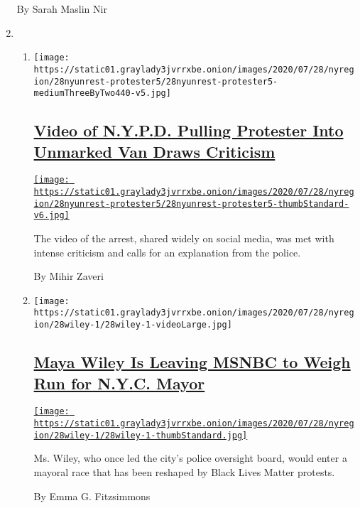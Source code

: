 \begin{enumerate}
  By Sarah Maslin Nir
\item
  \begin{enumerate}
  \def\labelenumii{\arabic{enumii}.}
  \item
    \texttt{[image: https://static01.graylady3jvrrxbe.onion/images/2020/07/28/nyregion/28nyunrest-protester5/28nyunrest-protester5-mediumThreeByTwo440-v5.jpg]}

    \hypertarget{video-of-nypd-pulling-protester-into-unmarked-van-draws-criticism}{%
    \subsection{\texorpdfstring{\href{/2020/07/28/nyregion/nypd-protester-van.html}{Video
    of N.Y.P.D. Pulling Protester Into Unmarked Van Draws
    Criticism}}{Video of N.Y.P.D. Pulling Protester Into Unmarked Van Draws Criticism}}\label{video-of-nypd-pulling-protester-into-unmarked-van-draws-criticism}}

    \href{/2020/07/28/nyregion/nypd-protester-van.html}{\texttt{[image: https://static01.graylady3jvrrxbe.onion/images/2020/07/28/nyregion/28nyunrest-protester5/28nyunrest-protester5-thumbStandard-v6.jpg]}}

    The video of the arrest, shared widely on social media, was met with
    intense criticism and calls for an explanation from the police.

    By Mihir Zaveri
  \item
    \texttt{[image: https://static01.graylady3jvrrxbe.onion/images/2020/07/28/nyregion/28wiley-1/28wiley-1-videoLarge.jpg]}

    \hypertarget{maya-wiley-is-leaving-msnbc-to-weigh-run-for-nyc-mayor}{%
    \subsection{\texorpdfstring{\href{/2020/07/28/nyregion/maya-wiley-mayor-nyc.html}{Maya
    Wiley Is Leaving MSNBC to Weigh Run for N.Y.C.
    Mayor}}{Maya Wiley Is Leaving MSNBC to Weigh Run for N.Y.C. Mayor}}\label{maya-wiley-is-leaving-msnbc-to-weigh-run-for-nyc-mayor}}

    \href{/2020/07/28/nyregion/maya-wiley-mayor-nyc.html}{\texttt{[image: https://static01.graylady3jvrrxbe.onion/images/2020/07/28/nyregion/28wiley-1/28wiley-1-thumbStandard.jpg]}}

    Ms. Wiley, who once led the city's police oversight board, would
    enter a mayoral race that has been reshaped by Black Lives Matter
    protests.

    By Emma G. Fitzsimmons
  \end{enumerate}
\end{enumerate}

